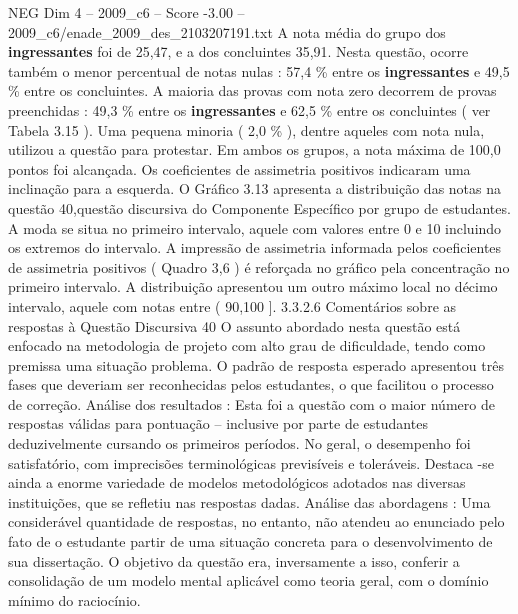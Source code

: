 \begin{textsample}{NEG Dim 4 – 2009\_c6 – Score -3.00 – 2009\_c6/enade\_2009\_des\_2103207191.txt}
A nota média do grupo dos \textbf{ingressantes} foi de 25,47, e a dos concluintes 35,91.
Nesta questão, ocorre também o menor percentual de notas nulas : 57,4 \% entre os \textbf{ingressantes} e 49,5 \% entre os concluintes.
A maioria das provas com nota zero decorrem de provas preenchidas : 49,3 \% entre os \textbf{ingressantes} e 62,5 \% entre os concluintes ( ver Tabela 3.15 ).
Uma pequena minoria ( 2,0 \% ), dentre aqueles com nota nula, utilizou a questão para protestar.
Em ambos os grupos, a nota máxima de 100,0 pontos foi alcançada.
Os coeficientes de assimetria positivos indicaram uma inclinação para a esquerda.
O Gráfico 3.13 apresenta a distribuição das notas na questão 40,questão discursiva do Componente Específico por grupo de estudantes.
A moda se situa no primeiro intervalo, aquele com valores entre 0 e 10 incluindo os extremos do intervalo.
A impressão de assimetria informada pelos coeficientes de assimetria positivos ( Quadro 3,6 ) é reforçada no gráfico pela concentração no primeiro intervalo.
A distribuição apresentou um outro máximo local no décimo intervalo, aquele com notas entre ( 90,100 ]. 3.3.2.6 Comentários sobre as respostas à Questão Discursiva 40 O assunto abordado nesta questão está enfocado na metodologia de projeto com alto grau de dificuldade, tendo como premissa uma situação problema.
O padrão de resposta esperado apresentou três fases que deveriam ser reconhecidas pelos estudantes, o que facilitou o processo de correção.
Análise dos resultados : Esta foi a questão com o maior número de respostas válidas para pontuação – inclusive por parte de estudantes deduzivelmente cursando os primeiros períodos.
No geral, o desempenho foi satisfatório, com imprecisões terminológicas previsíveis e toleráveis.
Destaca -se ainda a enorme variedade de modelos metodológicos adotados nas diversas instituições, que se refletiu nas respostas dadas.
Análise das abordagens : Uma considerável quantidade de respostas, no entanto, não atendeu ao enunciado pelo fato de o estudante partir de uma situação concreta para o desenvolvimento de sua dissertação.
O objetivo da questão era, inversamente a isso, conferir a consolidação de um modelo mental aplicável como teoria geral, com o domínio mínimo do raciocínio.

\end{textsample}

